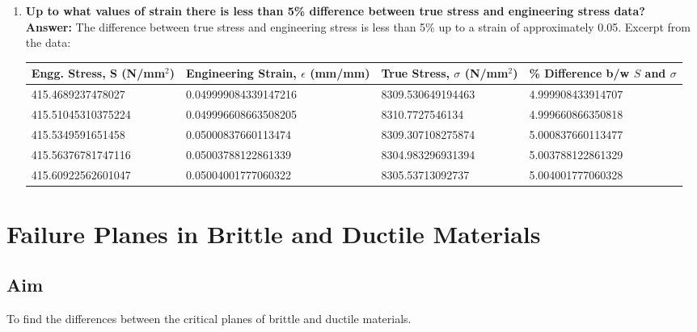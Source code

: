 \documentclass[12pt]{report}
\begin{document}
\begin{enumerate}
    \item \textbf{Up to what values of strain there is less than 5\% difference between true
              stress and engineering stress data?}\\
          \textbf{Answer:} The difference between true stress and engineering stress is less than 5\% up to a strain of approximately 0.05.
          Excerpt from the data:

          \begin{tabular}{|p{3.5cm}|p{4cm}|p{3.5cm}|p{3.5cm}|}
              \hline
              Engg. Stress, S (N/mm\(^2\)) & Engineering Strain, \(\epsilon\) (mm/mm) & True Stress, \(\sigma\) (N/mm\(^2\)) & \% Difference b/w \(S\) and \(\sigma\) \\
              \hline
              415.4689237478027            & 0.049999084339147216                     & 8309.530649194463                    & 4.999908433914707                      \\
              415.51045310375224           & 0.049996608663508205                     & 8310.7727546134                      & 4.999660866350818                      \\
              \rowcolor{gray!40}
              415.5349591651458            & 0.05000837660113474                      & 8309.307108275874                    & 5.000837660113477                      \\
              415.56376781747116           & 0.05003788122861339                      & 8304.983296931394                    & 5.003788122861329                      \\
              415.60922562601047           & 0.05004001777060322                      & 8305.53713092737                     & 5.004001777060328                      \\
              \hline
          \end{tabular}
\end{enumerate}

\chapter{Failure Planes in Brittle and Ductile Materials}
\section{Aim}
To find the differences between the critical planes of brittle and ductile materials.
\end{document}
